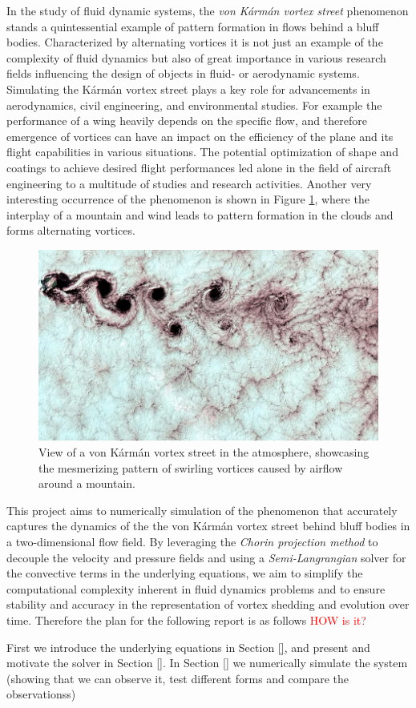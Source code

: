 In the study of fluid dynamic systems, the \textit{von Kármán vortex street} phenomenon stands a quintessential example of pattern formation in flows behind a bluff bodies. Characterized by alternating vortices it is not just an example of the complexity of fluid dynamics but also of great importance in various research fields influencing the design of objects in fluid- or aerodynamic systems. Simulating the Kármán vortex street plays a key role for advancements in aerodynamics, civil engineering, and environmental studies. For example the performance of a wing heavily depends on the specific flow, and therefore emergence of vortices can have an impact on the efficiency of the plane and its flight capabilities in various situations. The potential optimization of shape and coatings to achieve desired flight performances led alone in the field of aircraft engineering to a multitude of studies and research activities. Another very interesting occurrence of the phenomenon is shown in Figure \ref{fig: example vortices}, where the interplay of a mountain and wind leads to pattern formation in the clouds and forms alternating vortices. 


\begin{figure}[!htb]
        \centering
        \includegraphics[width=0.6\linewidth]{0_graphics/example_atmos.png}
        \caption{View of a von Kármán vortex street in the atmosphere, showcasing the mesmerizing pattern of swirling vortices caused by airflow around a mountain.}
        \label{fig: example vortices}
\end{figure}

This project aims to numerically simulation of the phenomenon that accurately captures the dynamics of the the von Kármán vortex street behind bluff bodies in a two-dimensional flow field. By leveraging the \textit{Chorin projection method} to decouple the velocity and pressure fields and using a \textit{Semi-Langrangian} solver for the convective terms in the underlying equations, we aim to simplify the computational complexity inherent in fluid dynamics problems and to ensure stability and accuracy in the representation of vortex shedding and evolution over time.
Therefore the plan for the following report is as follows \textcolor{red}{HOW is it?}

First we introduce the underlying equations in Section \ref{}, and present and motivate the solver in Section \ref{}. In Section \ref{} we numerically simulate the system (showing that we can observe it, test different forms and compare the observationss)\\